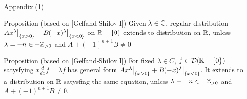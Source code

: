 \documentclass[8pt]{beamer}
\theoremstyle{mystyle}
\begin{document}
\begin{frame}{Appendix (1)}
	\begin{block}{Proposition (based on [Gelfand-Shilov I])}
		Given $\lambda\in\mathbb{C}$, regular distribution $Ax^\lambda\big|_{ \left\{ x>0 \right\} }+B(-x)^\lambda\big|_{ \left\{ x<0 \right\} }$
		on $\mathbb{R}-\left\{ 0 \right\}$
		extends to distribution on $\mathbb{R}$, unless $\lambda=-n\in-\mathbb{Z}_{ >0 }$ and $A+(-1)^{ n+1 }B\neq0$\footnotemark.
	\end{block}
	\begin{block}{Proposition (based on [Gelfand-Shilov I])}
		For fixed $\lambda\in C$, $f\in\mathcal{D}(\mathbb{R}-\left\{ 0 \right\})$ satysfying $x\frac{d}{dx}f=\lambda f$ has
		general form $Ax^\lambda\big|_{ \left\{ x>0 \right\} }+B(-x)^\lambda\big|_{ \left\{ x<0 \right\} }$. It extends
		to a distribution on $\mathbb{R}$ satysfing the same equation, unless $\lambda=-n\in-\mathbb{Z}_{ >0 }$ and $A+(-1)^{ n+1 }B\neq0$.
	\end{block}
\end{frame}
\end{document}
